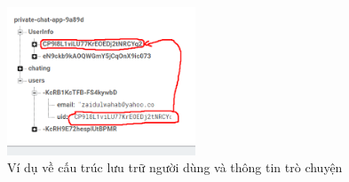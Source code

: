         \begin{figure}[H] 
            \centering
            \includegraphics[width=0.5\textwidth]{images/uid.png}
            \caption{Ví dụ về cấu trúc lưu trữ người dùng và thông tin trò chuyện}
            \label{fig:android}
        \end{figure}

